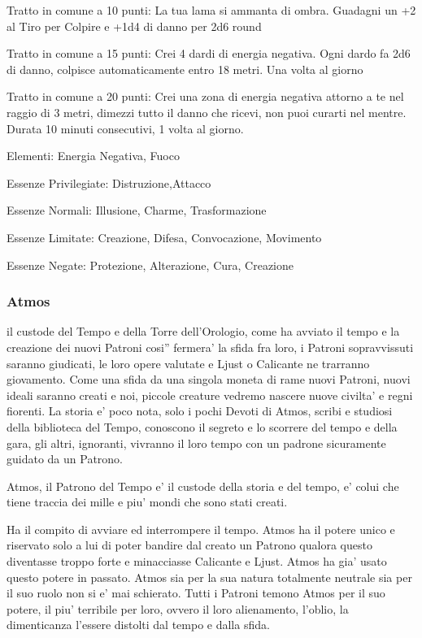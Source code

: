 \documentclass[a4paper,11pt,twoside,openany]{book}
\begin{document}
{		Tratto in comune a 10 punti: La tua lama si ammanta di ombra. Guadagni un +2 al Tiro per Colpire e +1d4 di danno per 2d6 round
		
		Tratto in comune a 15 punti: Crei 4 dardi di energia negativa. Ogni dardo fa 2d6 di danno, colpisce automaticamente entro 18 metri. Una volta al giorno
		
		Tratto in comune a 20 punti: Crei una zona di energia negativa attorno a te nel raggio di 3 metri, dimezzi tutto il danno che ricevi, non puoi curarti nel mentre. Durata 10 minuti consecutivi, 1 volta al giorno.
		
		\bigskip
		
		Elementi: Energia Negativa, Fuoco
		
		\bigskip
		
		Essenze Privilegiate: Distruzione,Attacco
		
		Essenze Normali: Illusione, Charme, Trasformazione
		
		Essenze Limitate: Creazione, Difesa, Convocazione, Movimento
		
		Essenze Negate: Protezione, Alterazione, Cura, Creazione
		
		\subsubsection{Atmos}
		
		\label{atmos}
		
		il custode del Tempo e della Torre dell'Orologio, come ha avviato il tempo e la creazione dei nuovi Patroni cosi'' fermera' la sfida fra loro, i Patroni sopravvissuti saranno giudicati, le loro opere valutate e Ljust o Calicante ne trarranno giovamento. Come una sfida da una singola moneta di rame nuovi Patroni, nuovi ideali saranno creati e noi, piccole creature vedremo nascere nuove civilta' e regni fiorenti. La storia e' poco nota, solo i pochi Devoti di Atmos, scribi e studiosi della biblioteca del Tempo, conoscono il segreto e lo scorrere del tempo e della gara, gli altri, ignoranti, vivranno il loro tempo con un padrone sicuramente guidato da un Patrono.
		
		Atmos, il Patrono del Tempo e' il custode della storia e del tempo, e' colui che tiene traccia dei mille e piu' mondi che sono stati creati.
		
		Ha il compito di avviare ed interrompere il tempo. Atmos ha il potere unico e riservato solo a lui di poter bandire dal creato un Patrono qualora questo diventasse troppo forte e minacciasse Calicante e Ljust. Atmos ha gia' usato questo potere in passato. Atmos sia per la sua natura totalmente neutrale sia per il suo ruolo non si e' mai schierato. Tutti i Patroni temono Atmos per il suo potere, il piu' terribile per loro, ovvero il loro alienamento, l'oblio, la dimenticanza l'essere distolti dal tempo e dalla sfida.
		
}
\end{document}

